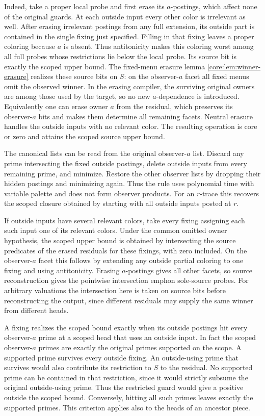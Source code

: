 Indeed, take a proper local probe and first erase its
$a$-postings, which affect none of the original guards.
At each outside input every other color is irrelevant
as well. After erasing irrelevant postings from any
full extension, its outside part is contained in the
single fixing just specified. Filling in that fixing
leaves a proper coloring because $a$ is absent.
Thus antitonicity makes this coloring worst among
all full probes whose restrictions lie below the
local probe. Its source bit is exactly the scoped
upper bound. The fixed-menu erasure lemma
\cref{core:lem:winner-erasure} realizes these
source bits on $S$: on the observer-$a$ facet all
fixed menus omit the observed winner. In the
erasing compiler, the surviving original owners
are among those used by the target, so no new
$a$-dependence is introduced. Equivalently one
can erase owner $a$ from the residual, which
preserves its observer-$a$ bits and makes them
determine all remaining facets. Neutral erasure
handles the outside inputs with no relevant color.
The resulting operation is core or zero and
attains the scoped source upper bound.

The canonical lists can be read from the original
observer-$a$ list. Discard any prime intersecting
the fixed outside postings, delete outside inputs
from every remaining prime, and minimize. Restore
the other observer lists by dropping their hidden
postings and minimizing again. Thus the rule uses
polynomial time with variable palette and does
not form observer products. For an $r$-trace this
recovers the scoped closure obtained by starting
with all outside inputs posted at $r$.

If outside inputs have several relevant colors,
take every fixing assigning each such input one of
its relevant colors. Under the common omitted owner
hypothesis, the scoped upper bound is obtained by intersecting
the source predicates of the erased residuals for
these fixings, with zero included. On the observer-$a$
facet this follows by extending any outside partial
coloring to one fixing and using antitonicity.
Erasing $a$-postings gives all other facets, so
source reconstruction gives the pointwise intersection
emph{on sole-source probes}. For arbitrary valuations
the intersection here is taken on source bits before
reconstructing the output, since different residuals
may supply the same winner from different heads.

A fixing realizes the scoped bound exactly when
its outside postings hit every observer-$a$ prime
at a scoped head that uses an outside input.
In fact the scoped observer-$a$ primes are exactly
the original primes supported on the scope.
A supported prime survives every outside fixing.
An outside-using prime that survives would also
contribute its restriction to $S$ to the residual.
No supported prime can be contained in that
restriction, since it would strictly subsume the
original outside-using prime. Thus the restricted
guard would give a positive outside the scoped
bound. Conversely, hitting all such primes leaves
exactly the supported primes. This criterion
applies also to the heads of an ancestor piece.

